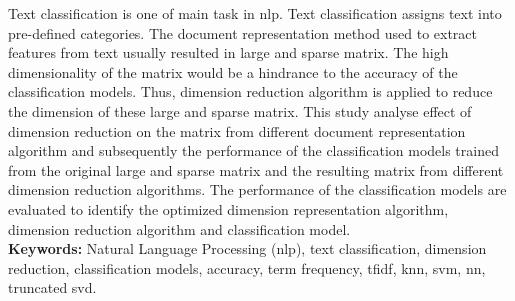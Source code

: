 Text classification is one of main task in \ac{nlp}. Text classification assigns text into pre-defined categories. The document representation method used to extract features from text usually resulted in large and sparse matrix. The high dimensionality of the matrix would be a hindrance to the accuracy of the classification models. Thus, dimension reduction algorithm is applied to reduce the dimension of these large and sparse matrix. This study analyse effect of dimension reduction on the matrix from different document representation algorithm and subsequently the performance of the classification models trained from the original large and sparse matrix and the resulting matrix from different dimension reduction algorithms. The performance of the classification models are evaluated to identify the optimized dimension representation algorithm, dimension reduction algorithm and classification model.\\

\textbf{Keywords: } Natural Language Processing (\ac{nlp}), text classification, dimension reduction, classification models, accuracy, term frequency, \ac{tfidf}, \ac{knn}, \ac{svm}, \ac{nn}, truncated \ac{svd}.

